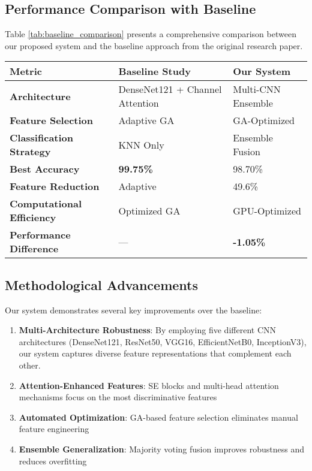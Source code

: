 \documentclass[journal]{IEEEtran}
\begin{document}
\subsection{Performance Comparison with Baseline}

Table \ref{tab:baseline_comparison} presents a comprehensive comparison between our proposed system and the baseline approach from the original research paper.

\begin{table*}[!t]
\centering
\caption{Performance Comparison: Proposed System vs. Baseline}
\label{tab:baseline_comparison}
\begin{tabular}{@{}lll@{}}
\toprule
\textbf{Metric} & \textbf{Baseline Study} & \textbf{Our System} \\
\midrule
\textbf{Architecture} & DenseNet121 + Channel Attention & Multi-CNN Ensemble \\
\textbf{Feature Selection} & Adaptive GA & GA-Optimized \\
\textbf{Classification Strategy} & KNN Only & Ensemble Fusion \\
\textbf{Best Accuracy} & \textbf{99.75\%} & 98.70\% \\
\textbf{Feature Reduction} & Adaptive & 49.6\% \\
\textbf{Computational Efficiency} & Optimized GA & GPU-Optimized \\
\textbf{Performance Difference} & --- & \textbf{-1.05\%} \\
\bottomrule
\end{tabular}
\end{table*}

\subsection{Methodological Advancements}

Our system demonstrates several key improvements over the baseline:

\begin{enumerate}
    \item \textbf{Multi-Architecture Robustness}: By employing five different CNN architectures (DenseNet121, ResNet50, VGG16, EfficientNetB0, InceptionV3), our system captures diverse feature representations that complement each other.
    \item \textbf{Attention-Enhanced Features}: SE blocks and multi-head attention mechanisms focus on the most discriminative features
    \item \textbf{Automated Optimization}: GA-based feature selection eliminates manual feature engineering
    \item \textbf{Ensemble Generalization}: Majority voting fusion improves robustness and reduces overfitting
\end{enumerate}
\end{document}
